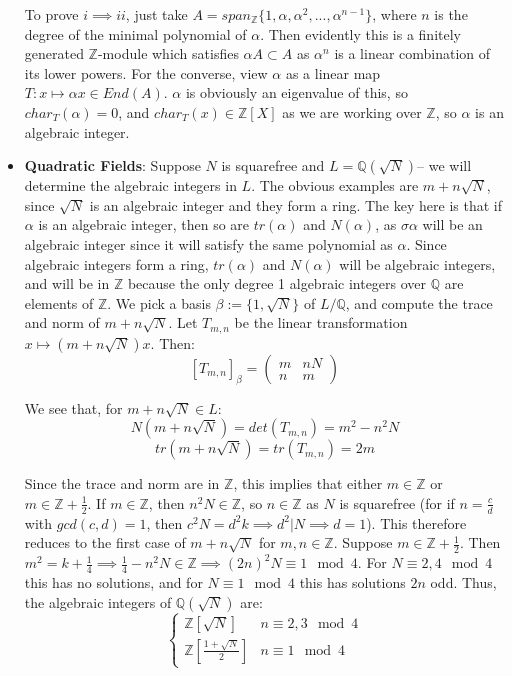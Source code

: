 \documentclass[11pt, oneside]{amsart}   	%
\theoremstyle{definition}
\begin{document}
\begin{itemize}
	To prove $i\implies ii$, just take $A = span_\mathbb{Z}\{1, \alpha, \alpha^2, ..., \alpha^{n - 1}\}$, where $n$ is the degree of the minimal polynomial of 
	$\alpha$. Then evidently this is a finitely generated $\mathbb Z$-module which satisfies $\alpha A\subset A$ as $\alpha^n$ is a linear combination of 
	its lower powers. For the converse, view $\alpha$ as a linear map $T : x\mapsto \alpha x\in End(A)$. $\alpha$ is obviously an eigenvalue of this, so 
	$char_T(\alpha) = 0$, and $char_T(x)\in \mathbb Z[X]$ as we are working over $\mathbb Z$, so $\alpha$ is an algebraic integer.
	
	\item \textbf{Quadratic Fields}: Suppose $N$ is squarefree and $L = \mathbb Q(\sqrt{N})$-- we will determine the algebraic integers in $L$. The 
	obvious examples are $m + n\sqrt{N}$, since $\sqrt{N}$ is an algebraic integer and they form a ring. The key here is that if $\alpha$ is an algebraic 
	integer, then so are $tr(\alpha)$ and $N(\alpha)$, as $\sigma\alpha$ will be an algebraic integer since it will satisfy the same polynomial as $\alpha$. 
	Since algebraic integers form a ring, $tr(\alpha)$ and $N(\alpha)$ will be algebraic integers, and will be in $\mathbb Z$ because the only degree 1 
	algebraic integers over $\mathbb Q$ are elements of $\mathbb Z$. We pick a basis $\beta := \{1, \sqrt{N}\}$ of $L / \mathbb Q$, and compute the trace 
	and norm of $m + n\sqrt{N}$. Let $T_{m, n}$ be the linear transformation $x\mapsto (m + n\sqrt{N})x$. Then:
	$$
		[T_{m, n}]_\beta = 
		\begin{pmatrix}
			m & nN \\ n & m
		\end{pmatrix}
	$$
	
	We see that, for $m + n\sqrt{N}\in L$:
	$$
		N(m + n\sqrt{N}) = det(T_{m ,n}) = m^2 - n^2 N
	$$
	$$
		tr(m + n\sqrt{N}) = tr(T_{m, n}) = 2m
	$$
	
	Since the trace and norm are in $\mathbb Z$, this implies that either $m\in\mathbb Z$ or $m\in\mathbb Z + \frac{1}{2}$. If $m\in \mathbb Z$, then 
	$n^2 N\in \mathbb Z$, so $n\in\mathbb Z$ as $N$ is squarefree (for if $n = \frac{c}{d}$ with $gcd(c, d) = 1$, then $c^2 N = d^2 k\implies d^2 | N\implies 
	d = 1$). This therefore reduces to the first case of $m + n\sqrt{N}$ for $m, n\in\mathbb Z$. Suppose $m\in\mathbb Z + \frac{1}{2}$. Then $m^2 = k + 
	\frac{1}{4}\implies \frac{1}{4} - n^2 N \in\mathbb Z\implies (2n)^2 N\equiv 1\mod 4$. For $N\equiv 2, 4\mod 4$ this has no solutions, and for $N\equiv 1
	\mod 4$ this has solutions $2n$ odd. Thus, the algebraic integers of $\mathbb Q(\sqrt{N})$ are:
	$$
	\begin{cases} 
		\mathbb Z[\sqrt{N}] & n\equiv 2, 3\mod 4 \\
		\mathbb Z[\frac{1 + \sqrt{N}}{2}] & n\equiv 1\mod 4
	\end{cases}
	$$
	

\end{itemize}
\end{document}
